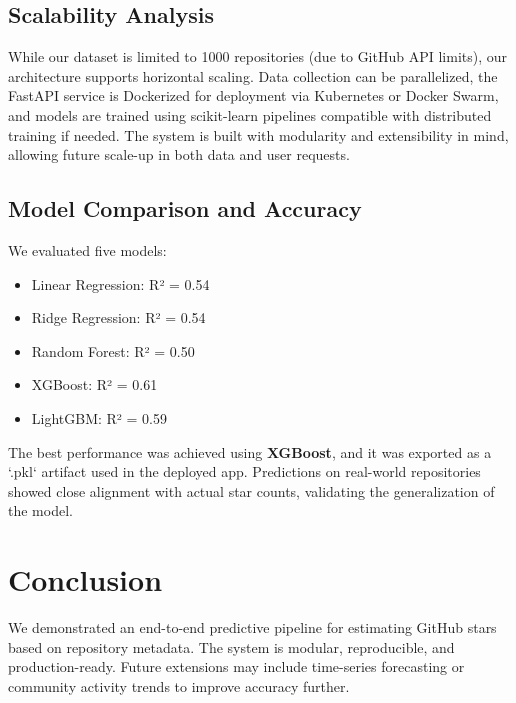 \documentclass[12pt,a4paper]{article}
\begin{document}
\subsection{Scalability Analysis}
While our dataset is limited to 1000 repositories (due to GitHub API limits), our architecture supports horizontal scaling. Data collection can be parallelized, the FastAPI service is Dockerized for deployment via Kubernetes or Docker Swarm, and models are trained using scikit-learn pipelines compatible with distributed training if needed. The system is built with modularity and extensibility in mind, allowing future scale-up in both data and user requests.

\subsection{Model Comparison and Accuracy}
We evaluated five models:
\begin{itemize}[noitemsep]
    \item Linear Regression: R² = 0.54
    \item Ridge Regression: R² = 0.54
    \item Random Forest: R² = 0.50
    \item XGBoost: R² = 0.61
    \item LightGBM: R² = 0.59
\end{itemize}

The best performance was achieved using \textbf{XGBoost}, and it was exported as a `.pkl` artifact used in the deployed app. Predictions on real-world repositories showed close alignment with actual star counts, validating the generalization of the model.

\section{Conclusion}
We demonstrated an end-to-end predictive pipeline for estimating GitHub stars based on repository metadata. The system is modular, reproducible, and production-ready. Future extensions may include time-series forecasting or community activity trends to improve accuracy further.
\end{document}
